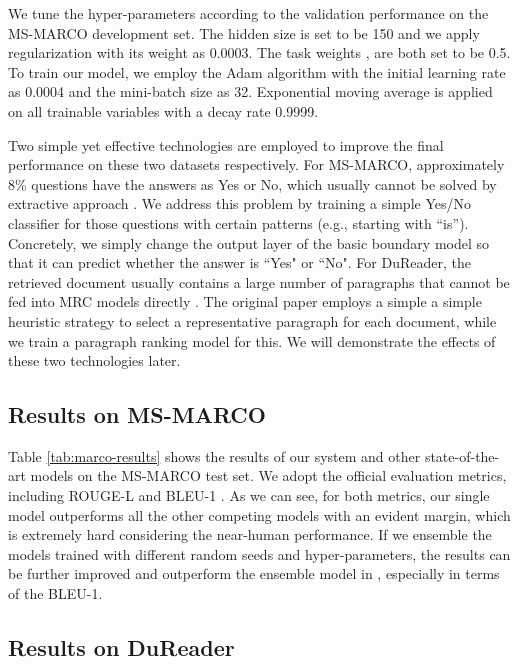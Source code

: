 \documentclass[11pt,a4paper]{article}
\newcommand{\tabref}[1]{Table \ref{#1}}
\begin{document}
We tune the hyper-parameters according to the validation performance on the MS-MARCO development set. The hidden size is set to be 150 and we apply  regularization with its weight as 0.0003. The task weights ,  are both set to be 0.5. To train our model, we employ the Adam algorithm \cite{adam} with the initial learning rate as 0.0004 and the mini-batch size as 32. Exponential moving average is applied on all trainable variables with a decay rate 0.9999.

Two simple yet effective technologies are employed to improve the final performance on these two datasets respectively. For MS-MARCO, approximately 8\% questions have the answers as Yes or No, which usually cannot be solved by extractive approach \cite{snet}. We address this problem by training a simple Yes/No classifier for those questions with certain patterns (e.g., starting with ``is''). Concretely, we simply change the output layer of the basic boundary model so that it can predict whether the answer is ``Yes" or ``No". For DuReader, the retrieved document usually contains a large number of paragraphs that cannot be fed into MRC models directly \cite{dureader}. The original paper employs a simple a simple heuristic strategy to select a representative paragraph for each document, while we train a paragraph ranking model for this. We will demonstrate the effects of these two technologies later.


    
\subsection{Results on MS-MARCO}

\tabref{tab:marco-results} shows the results of our system and other state-of-the-art models on the MS-MARCO test set. We adopt the official evaluation metrics, including ROUGE-L \cite{rouge} and BLEU-1 \cite{bleu}. As we can see, for both metrics, our single model outperforms all the other competing models with an evident margin, which is extremely hard considering the near-human performance. If we ensemble the models trained with different random seeds and hyper-parameters, the results can be further improved and outperform the ensemble model in , especially in terms of the BLEU-1. 


\subsection{Results on DuReader}
\end{document}
